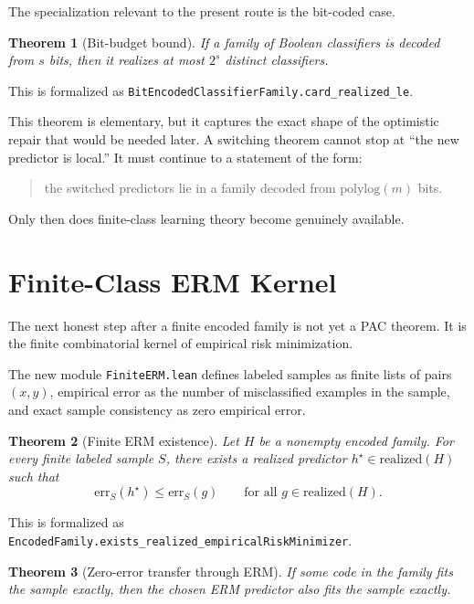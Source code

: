 \documentclass[11pt]{article}
\newtheorem{theorem}{Theorem}[section]
\theoremstyle{remark}
\begin{document}
The specialization relevant to the present route is the bit-coded case.

\begin{theorem}[Bit-budget bound]
If a family of Boolean classifiers is decoded from \(s\) bits, then it realizes at
most \(2^s\) distinct classifiers.
\end{theorem}

\noindent
This is formalized as
\texttt{BitEncodedClassifierFamily.card\_realized\_le}.

This theorem is elementary, but it captures the exact shape of the optimistic
repair that would be needed later.  A switching theorem cannot stop at ``the new
predictor is local.''  It must continue to a statement of the form:

\begin{quote}
the switched predictors lie in a family decoded from \(\mathrm{polylog}(m)\) bits.
\end{quote}

Only then does finite-class learning theory become genuinely available.

\section{Finite-Class ERM Kernel}

The next honest step after a finite encoded family is not yet a PAC theorem.
It is the finite combinatorial kernel of empirical risk minimization.

The new module \texttt{FiniteERM.lean} defines labeled samples as finite lists of
pairs \((x,y)\), empirical error as the number of misclassified examples in the
sample, and exact sample consistency as zero empirical error.

\begin{theorem}[Finite ERM existence]
Let \(H\) be a nonempty encoded family.  For every finite labeled sample \(S\),
there exists a realized predictor \(h^\star \in \mathrm{realized}(H)\) such that
\[
  \mathrm{err}_S(h^\star) \le \mathrm{err}_S(g)
  \qquad
  \text{for all } g \in \mathrm{realized}(H).
\]
\end{theorem}

\noindent
This is formalized as
\texttt{EncodedFamily.exists\_realized\_empiricalRiskMinimizer}.

\begin{theorem}[Zero-error transfer through ERM]
If some code in the family fits the sample exactly, then the chosen ERM
predictor also fits the sample exactly.
\end{theorem}
\end{document}

